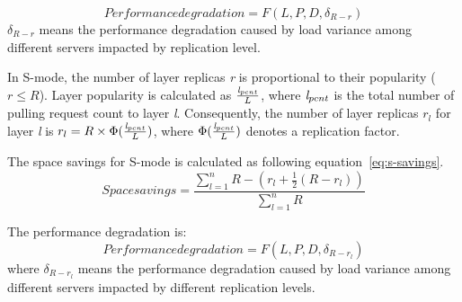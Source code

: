  
 \begin{equation}\label{eq:c-pull}
Performance degradation =  F(L, P, D, \delta_{R-r})
 \end{equation}
 $\delta_{R-r}$ means the performance degradation caused by load variance among different servers impacted by replication level.

In S-mode, the number of layer replicas \emph{r} is proportional to their popularity ($r \leq R$).
Layer popularity is calculated as $\frac{\emph{l}_{pcnt}}{L}$, 
where $\emph{l}_{pcnt}$ is the total number of pulling request count to layer \emph{l}.  
Consequently, the number of layer replicas $r_{l}$ for layer \emph{l} is
$r_{l} = R \times \Phi (\frac{\emph{l}_{pcnt}}{L})$, 
where $\Phi (\frac{\emph{l}_{pcnt}}{L})$ denotes a replication factor.

The space savings for S-mode is calculated as following equation~\ref{eq:s-savings}.
\begin{equation}\label{eq:s-savings}
Space savings = \frac{\sum\limits_{l=1}^n{R-(r_{l}+\frac{1}{2}(R-r_{l}))}}{\sum\limits_{l=1}^n{R}} 
\end{equation}

The performance degradation is:
  \begin{equation}\label{eq:s-pull}
Performance degradation =  F(L, P, D, \delta_{R-r_{l}})
 \end{equation}
where $\delta_{R-r_{l}}$ means 
the performance degradation caused by load variance among different servers impacted by different replication levels.
 
